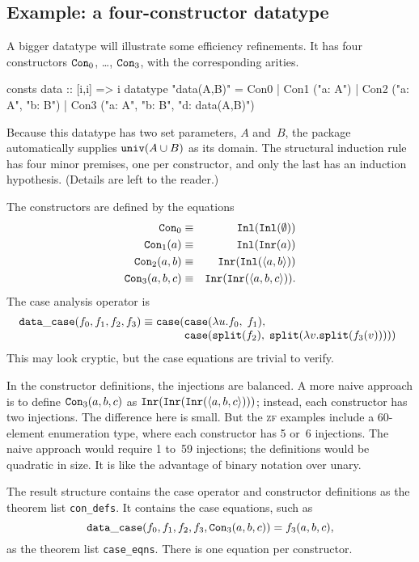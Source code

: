 \documentclass[12pt,a4paper]{article}
\newcommand\split{\hbox{\tt split}}
\newcommand\univ{\hbox{\tt univ}}
\newcommand\Inl{\hbox{\tt Inl}}
\newcommand\Inr{\hbox{\tt Inr}}
\newcommand\case{\hbox{\tt case}}
\newcommand\Con{\hbox{\tt Con}}
\begin{document}
\subsection{Example: a four-constructor datatype}
A bigger datatype will illustrate some efficiency 
refinements.  It has four constructors $\Con_0$, \ldots, $\Con_3$, with the
corresponding arities.
\begin{ttbox}
consts    data :: [i,i] => i
datatype  "data(A,B)" = Con0
                      | Con1 ("a: A")
                      | Con2 ("a: A", "b: B")
                      | Con3 ("a: A", "b: B", "d: data(A,B)")
\end{ttbox}
Because this datatype has two set parameters, $A$ and~$B$, the package
automatically supplies $\univ(A\un B)$ as its domain.  The structural
induction rule has four minor premises, one per constructor, and only the last
has an induction hypothesis.  (Details are left to the reader.)

The constructors are defined by the equations
\begin{eqnarray*}
  \Con_0         & \equiv & \Inl(\Inl(\emptyset)) \\
  \Con_1(a)      & \equiv & \Inl(\Inr(a)) \\
  \Con_2(a,b)    & \equiv & \Inr(\Inl(\pair{a,b})) \\
  \Con_3(a,b,c)  & \equiv & \Inr(\Inr(\pair{a,b,c})).
\end{eqnarray*} 
The case analysis operator is
\[ {\tt data\_case}(f_0,f_1,f_2,f_3) \equiv 
    \case(\begin{array}[t]{@{}l}
          \case(\lambda u.f_0,\; f_1),\, \\
          \case(\split(f_2),\; \split(\lambda v.\split(f_3(v)))) )
   \end{array} 
\]
This may look cryptic, but the case equations are trivial to verify.

In the constructor definitions, the injections are balanced.  A more naive
approach is to define $\Con_3(a,b,c)$ as $\Inr(\Inr(\Inr(\pair{a,b,c})))$;
instead, each constructor has two injections.  The difference here is small.
But the \textsc{zf} examples include a 60-element enumeration type, where each
constructor has 5 or~6 injections.  The naive approach would require 1 to~59
injections; the definitions would be quadratic in size.  It is like the
advantage of binary notation over unary.

The result structure contains the case operator and constructor definitions as
the theorem list \verb|con_defs|. It contains the case equations, such as 
\[ {\tt data\_case}(f_0,f_1,f_2,f_3,\Con_3(a,b,c)) = f_3(a,b,c), \]
as the theorem list \verb|case_eqns|.  There is one equation per constructor.
\end{document}
